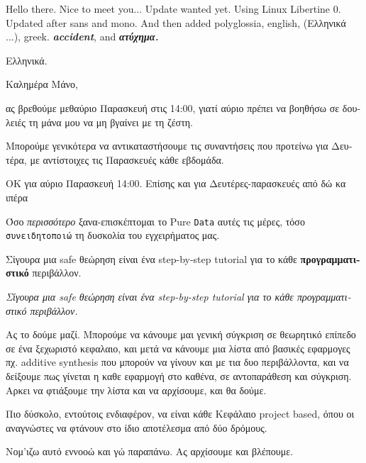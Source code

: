 \documentclass{article}
\begin{document}
Hello there. Nice to meet you...
Update wanted yet. Using Linux Libertine 0.
Updated after sans and mono.  And then added polyglossia, \textsf{english}, (Ελληνικά ...), greek. \textbf{\textit{accident}}, and \textbf{\textit{ατύχημα.}}

\begin{greek}
  Ελληνικά.

  Καλημέρα Μάνο,

    ας βρεθούμε μεθαύριο \textsf{Παρασκευή} στις 14:00, γιατί αύριο πρέπει να βοηθήσω σε δουλειές τη μάνα μου να μη βγαίνει με τη ζέστη.

    Μπορούμε γενικότερα να αντικαταστήσουμε τις συναντήσεις που προτείνω για Δευτέρα, με αντίστοιχες τις Παρασκευές κάθε εβδομάδα.


ΟΚ για αύριο Παρασκευή 14:00.
Επίσης και για Δευτέρες-παρασκευές από δώ κα ιπέρα

    Όσο \textit{περισσότερο} ξανα-επισκέπτομαι το Pure \texttt{Data} αυτές τις μέρες, τόσο \texttt{συνειδητοποιώ} τη δυσκολία του εγχειρήματος μας.

    Σίγουρα μια safe θεώρηση είναι ένα step-by-step tutorial για το κάθε \textbf{προγραμματιστικό} περιβάλλον.

\textit{Σίγουρα μια safe θεώρηση είναι ένα step-by-step tutorial για το κάθε προγραμματιστικό περιβάλλον.}


Ας το δούμε μαζί. Μπορούμε να κάνουμε μαι γενική σύγκριση σε θεωρητικό επίπεδο σε ένα ξεχωριστό κεφαλαιο,
και μετά να κάνουμε μια λίστα από βασικές εφαρμογες πχ. additive synthesis που μπορούν να γίνουν και με τια
δυο περιβάλλοντα, και να δείξουμε πως γίνεται η καθε εφαρμογή στο καθένα, σε αντοπαράθεση και σύγκριση.
Αρκει να φτιάξουμε την λίστα και να αρχίσουμε, και θα δούμε.

    Πιο δύσκολο, εντούτοις ενδιαφέρον, να είναι κάθε Κεφάλαιο project based, όπου οι αναγνώστες να φτάνουν στο ίδιο αποτέλεσμα από δύο δρόμους.


Νομ'ιζω αυτό εννοοώ και γώ παραπάνω. Ας αρχίσουμε και βλέπουμε.
\end{greek}
\end{document}

